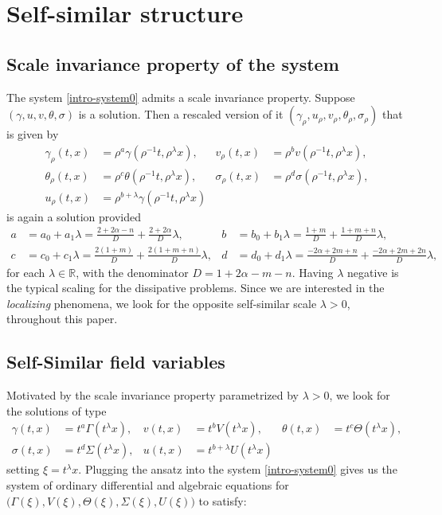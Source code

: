 \documentclass[a4paper,11pt]{article}
\begin{document}
\section{Self-similar structure} \label{sec:scale}

\subsection{Scale invariance property of the system}
The system \eqref{intro-system0} admits a scale invariance property. Suppose $(\gamma,u,v,\theta,\sigma)$ is a solution. Then a rescaled version of it $(\gamma_\rho,u_\rho,v_\rho,\theta_\rho,\sigma_\rho)$ that is given by
\begin{equation}\label{eq:scale}
\begin{aligned}
 \gamma_\rho(t,x) &= \rho^a\gamma(\rho^{-1}t,\rho^\lambda x), &
 v_\rho(t,x) &= \rho^bv(\rho^{-1}t,\rho^\lambda x),\\
 \theta_\rho(t,x) &= \rho^c\theta(\rho^{-1}t,\rho^\lambda x), &
 \sigma_\rho(t,x) &= \rho^d\sigma(\rho^{-1}t,\rho^\lambda x),\\
 u_\rho(t,x) &= \rho^{b+\lambda}\gamma(\rho^{-1}t,\rho^\lambda x)
\end{aligned}
\end{equation}
is again a solution provided
\begin{equation} \label{eq:exponents}
\begin{aligned}
 a&= a_0 + a_1 \lambda=\frac{2+2\alpha-n}{D} + \frac{2+2\alpha}{D}\lambda, & b&=b_0 + b_1\lambda=\frac{1+m}{D} + \frac{1+m+n}{D}\lambda ,\\
 c&=c_0 + c_1\lambda=\frac{2(1+m)}{D} + \frac{2(1+m+n)}{D}\lambda, & d&=d_0 + d_1\lambda=\frac{-2\alpha + 2m +n}{D} + \frac{-2\alpha+2m+2n}{D}\lambda,
\end{aligned}
\end{equation}
for each $\lambda \in \mathbb{R}$, with the denominator $D = 1+2\alpha-m-n$. Having $\lambda$ negative is the typical scaling for the dissipative problems. Since we are interested in the {\it localizing} phenomena, we look for the opposite self-similar scale $\lambda>0$, throughout this paper.

\subsection{Self-Similar field variables}
Motivated by the scale invariance property parametrized by $\lambda>0$, we look for the solutions of type
\begin{equation}\label{eq:ORItoCAP}
\begin{aligned}
 \gamma(t,x) &= t^a\Gamma(t^\lambda x), & v(t,x) &= t^b V(t^\lambda x), &\theta(t,x) &= t^c \Theta(t^\lambda x),\\
 \sigma(t,x) &= t^d \Sigma(t^\lambda x), & u(t,x) &= t^{b+\lambda} U(t^\lambda x)
\end{aligned}
\end{equation}
setting $\xi = t^\lambda x$. Plugging the ansatz into the system \eqref{intro-system0} gives us the system of ordinary differential and algebraic equations for $\big(\Gamma(\xi), V(\xi), \Theta(\xi), \Sigma(\xi), U(\xi)\big)$ to satisfy:
\end{document}
